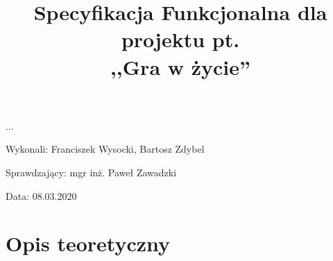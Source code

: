 \documentclass{article}
\title{Specyfikacja Funkcjonalna dla projektu pt. \\ ,,Gra w życie''}
\author{}
\date{}
\begin{document}
\maketitle

\begin{flushright}
\par ...
\vfill
\par
Wykonali: Franciszek Wysocki, Bartosz Zdybel

Sprawdzający: mgr inż. Paweł Zawadzki

Data: 08.03.2020
\end{flushright}

\thispagestyle{empty}
\newpage
\begin{frame}{}
    \tableofcontents
\end{frame}
\newpage
{}
\section{Opis teoretyczny}
\end{document}
